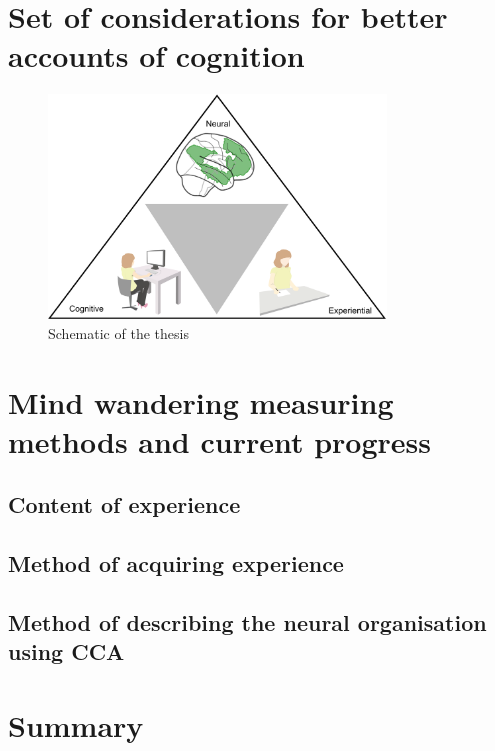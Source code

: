\section{Set of considerations for better accounts of cognition}


\begin{figure}[H]
	\centering
	\includegraphics[width=0.8\textwidth]{chapters/img/thesisfig1.png}
	\caption{Schematic of the thesis} 
	\label{fig:thesis:fig1}
\end{figure}

\section{Mind wandering measuring methods and current progress}

\subsection{Content of experience}

\cite{Medea2016}
\cite{RubyPlos2013}
\cite{Smallwood2016}

\subsection{Method of acquiring experience}
\cite{Christoff2009}
\cite{Konishi2015}

\cite{Smallwood2011}
\cite{Gorgolewski2014}

\subsection{Method of describing the neural organisation using CCA}
\section{Summary}

